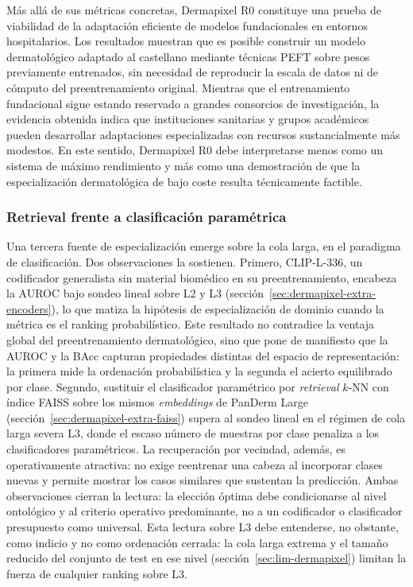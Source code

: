 Más allá de sus métricas concretas, Dermapixel R0 constituye una prueba
de viabilidad de la adaptación eficiente de modelos fundacionales en
entornos hospitalarios. Los resultados muestran que es posible construir
un modelo dermatológico adaptado al castellano mediante técnicas PEFT
sobre pesos previamente entrenados, sin necesidad de reproducir la
escala de datos ni de cómputo del preentrenamiento original. Mientras
que el entrenamiento fundacional sigue estando reservado a grandes
consorcios de investigación, la evidencia obtenida indica que
instituciones sanitarias y grupos académicos pueden desarrollar
adaptaciones especializadas con recursos sustancialmente más modestos.
En este sentido, Dermapixel R0 debe interpretarse menos como un sistema
de máximo rendimiento y más como una demostración de que la
especialización dermatológica de bajo coste resulta técnicamente
factible.

\subsubsection{Retrieval frente a clasificación paramétrica}
\label{sec:disc-retrieval}

Una tercera fuente de especialización emerge sobre la cola larga, en
el paradigma de clasificación. Dos observaciones la sostienen.
Primero, CLIP-L-336, un codificador generalista sin material
biomédico en su preentrenamiento, encabeza la AUROC bajo sondeo lineal
sobre L2 y L3 (sección~\ref{sec:dermapixel-extra-encoders}), lo que
matiza la hipótesis de especialización de dominio cuando la métrica es
el ranking probabilístico. Este resultado no contradice la ventaja
global del preentrenamiento dermatológico, sino que pone de manifiesto
que la AUROC y la BAcc capturan propiedades distintas del espacio de
representación: la primera mide la ordenación probabilística y la
segunda el acierto equilibrado por clase. Segundo, sustituir el clasificador
paramétrico por \emph{retrieval} $k$-NN con índice FAISS sobre los
mismos \emph{embeddings} de PanDerm Large
(sección~\ref{sec:dermapixel-extra-faiss}) supera al sondeo lineal en
el régimen de cola larga severa L3, donde el escaso número de muestras
por clase penaliza a los clasificadores paramétricos. La recuperación
por vecindad, además, es operativamente atractiva: no exige reentrenar
una cabeza al incorporar clases nuevas y permite mostrar los casos
similares que sustentan la predicción. Ambas observaciones cierran la
lectura: la elección óptima debe condicionarse al nivel ontológico y
al criterio operativo predominante, no a un codificador o clasificador
presupuesto como universal. Esta lectura sobre L3 debe entenderse, no
obstante, como indicio y no como ordenación cerrada: la cola larga
extrema y el tamaño reducido del conjunto de test en ese nivel
(sección~\ref{sec:lim-dermapixel}) limitan la fuerza de cualquier
ranking sobre L3.

